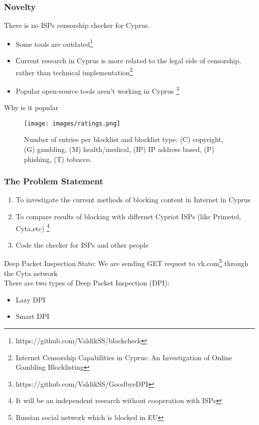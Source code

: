 \documentclass[12pt,aspectratio=169,hyperref={pdftex,unicode},xcolor=dvipsnames]{beamer}
\begin{document}
  \begin{frame}
        \frametitle{Novelty}
        There is no ISPs censorship checker for Cyprus.
        \begin{itemize}
            \item Some tools are outdated\footnote{https://github.com/ValdikSS/blockcheck} 
            \item Сurrent research in Cyprus is more related to the legal side of censorship, rather than technical implementation\footnote{Internet Censorship Capabilities in Cyprus: An Investigation of Online Gambling Blocklisting}
            \item Popular open-source tools aren't working in Cyprus \footnote{https://github.com/ValdikSS/GoodbyeDPI}
        \end{itemize}


    \end{frame}


    \begin{frame}{Why is it popular}
        \begin{figure}
            \centering
            \texttt{[image: images/ratings.png]}
            \caption{Number of entries per blocklist and blocklist type: (C) copyright, (G) gambling, (M) health/medical,
(IP) IP address based, (P) phishing, (T) tobacco. }
            \label{fig:rating}
        \end{figure}
    \end{frame}



    \begin{frame}
        \frametitle{The Problem Statement}
         \begin{enumerate}
            \item To investigate the current methods of blocking content in Internet in Cyprus
            \item  To compare results of blocking with differnet  Cypriot ISPs (like Primetel, Cyta,etc) \footnote{It will be an independent research without cooperation with ISPs}
            \item Code the checker for ISPs and other people
        \end{enumerate}



     

    \end{frame}

    
      \begin{frame}{Deep Packet Inspection}
       State: We are sending GET request to vk.com\footnote{Russian social network which is blocked in EU}  through the Cyta network \\ 
      There are two types of Deep Packet Inspection (DPI): 
        \begin{itemize}
            \item Lazy DPI
            \item Smart DPI
        \end{itemize}
        
            
        \end{frame}
\end{document}
